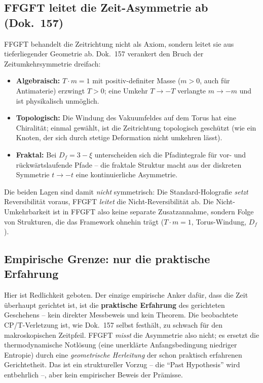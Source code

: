 \subsection*{FFGFT leitet die Zeit-Asymmetrie ab (Dok.~157)}

FFGFT behandelt die Zeitrichtung nicht als Axiom, sondern leitet sie aus
tieferliegender Geometrie ab. Dok.~157 verankert den Bruch der
Zeitumkehrsymmetrie dreifach:

\begin{itemize}
  \item \textbf{Algebraisch:} $T \cdot m = 1$ mit positiv-definiter Masse
        ($m > 0$, auch für Antimaterie) erzwingt $T > 0$; eine Umkehr
        $T \to -T$ verlangte $m \to -m$ und ist physikalisch unmöglich.
  \item \textbf{Topologisch:} Die Windung des Vakuumfeldes auf dem Torus hat
        eine Chiralität; einmal gewählt, ist die Zeitrichtung topologisch
        geschützt (wie ein Knoten, der sich durch stetige Deformation nicht
        umkehren lässt).
  \item \textbf{Fraktal:} Bei $D_f = 3 - \xi$ unterscheiden sich die
        Pfadintegrale für vor- und rückwärtslaufende Pfade -- die fraktale
        Struktur macht aus der diskreten Symmetrie $t \to -t$ eine
        kontinuierliche Asymmetrie.
\end{itemize}

\noindent
Die beiden Lagen sind damit \emph{nicht} symmetrisch: Die Standard-Holografie
\emph{setzt} Reversibilität voraus, FFGFT \emph{leitet} die Nicht-Reversibilität
ab. Die Nicht-Umkehrbarkeit ist in FFGFT also keine separate Zusatzannahme,
sondern Folge von Strukturen, die das Framework ohnehin trägt
($T\cdot m=1$, Torus-Windung, $D_f$).

\subsection*{Empirische Grenze: nur die praktische Erfahrung}

Hier ist Redlichkeit geboten. Der einzige empirische Anker dafür, dass die
Zeit überhaupt gerichtet ist, ist die \textbf{praktische Erfahrung} des
gerichteten Geschehens -- kein direkter Messbeweis und kein Theorem. Die
beobachtete CP/T-Verletzung ist, wie Dok.~157 selbst festhält, zu schwach für
den makroskopischen Zeitpfeil. FFGFT \emph{misst} die Asymmetrie also nicht;
es ersetzt die thermodynamische Notlösung (eine unerklärte Anfangsbedingung
niedriger Entropie) durch eine \emph{geometrische Herleitung} der schon
praktisch erfahrenen Gerichtetheit. Das ist ein struktureller Vorzug -- die
\enquote{Past Hypothesis} wird entbehrlich --, aber kein empirischer Beweis
der Prämisse.

